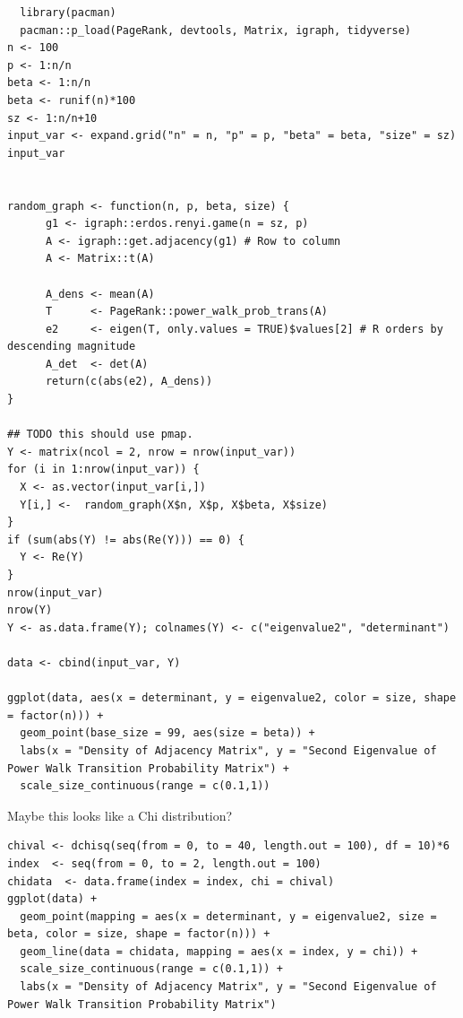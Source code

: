 \documentclass[11pt]{article}
\begin{document}
\lstset{language=r,label= ,caption= ,captionpos=b,numbers=none}
\begin{lstlisting}
  library(pacman)
  pacman::p_load(PageRank, devtools, Matrix, igraph, tidyverse)
n <- 100
p <- 1:n/n
beta <- 1:n/n
beta <- runif(n)*100
sz <- 1:n/n+10
input_var <- expand.grid("n" = n, "p" = p, "beta" = beta, "size" = sz)
input_var


random_graph <- function(n, p, beta, size) {
      g1 <- igraph::erdos.renyi.game(n = sz, p)
      A <- igraph::get.adjacency(g1) # Row to column
      A <- Matrix::t(A)

      A_dens <- mean(A)
      T      <- PageRank::power_walk_prob_trans(A)
      e2     <- eigen(T, only.values = TRUE)$values[2] # R orders by descending magnitude
      A_det  <- det(A)
      return(c(abs(e2), A_dens))
}

## TODO this should use pmap.
Y <- matrix(ncol = 2, nrow = nrow(input_var))
for (i in 1:nrow(input_var)) {
  X <- as.vector(input_var[i,])
  Y[i,] <-  random_graph(X$n, X$p, X$beta, X$size)
}
if (sum(abs(Y) != abs(Re(Y))) == 0) {
  Y <- Re(Y)
}
nrow(input_var)
nrow(Y)
Y <- as.data.frame(Y); colnames(Y) <- c("eigenvalue2", "determinant")

data <- cbind(input_var, Y)

ggplot(data, aes(x = determinant, y = eigenvalue2, color = size, shape = factor(n))) +
  geom_point(base_size = 99, aes(size = beta)) +
  labs(x = "Density of Adjacency Matrix", y = "Second Eigenvalue of Power Walk Transition Probability Matrix") +
  scale_size_continuous(range = c(0.1,1))
\end{lstlisting}

Maybe this looks like a Chi distribution?

\lstset{language=r,label= ,caption= ,captionpos=b,numbers=none}
\begin{lstlisting}
chival <- dchisq(seq(from = 0, to = 40, length.out = 100), df = 10)*6
index  <- seq(from = 0, to = 2, length.out = 100)
chidata  <- data.frame(index = index, chi = chival)
ggplot(data) +
  geom_point(mapping = aes(x = determinant, y = eigenvalue2, size = beta, color = size, shape = factor(n))) +
  geom_line(data = chidata, mapping = aes(x = index, y = chi)) +
  scale_size_continuous(range = c(0.1,1)) +
  labs(x = "Density of Adjacency Matrix", y = "Second Eigenvalue of Power Walk Transition Probability Matrix")
\end{lstlisting}
\end{document}
